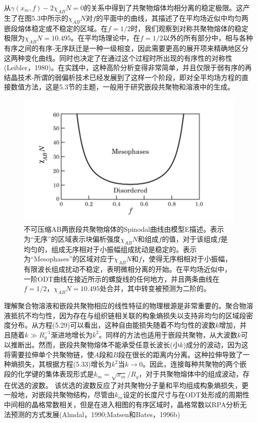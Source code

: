 从$\gamma(x_m,f)-2\chi_{AB}N=0$的关系中得到了共聚物熔体均相分离的稳定极限。这产生了在图5.3中所示的$\chi_{AB}N$对$f$的平面中的曲线，其描述了在平均场近似中均匀两嵌段熔体稳定或不稳定的区域。在$f=1/2$时，我们观察到对称共聚物熔体的稳定极限为$\chi_{AB}N=10.495$。在平均场理论中，在$f=1/2$以外的所有部分中，相与各种有序之间的有序-无序跃迁是一种一级相变，因此需要更高的展开项来精确地区分这两种变化曲线。同时也决定了在通过这个过程时所出现的有序性的对称性(Leibler，1980)。在实践中，这种高阶分析变得非常简单，并且仅限于弱有序的再结晶技术-所谓的弱偏析技术已经发展到了这样一个阶段，即对全平均场方程的直接数值方法，这是5.3节的主题，一般用于研究嵌段共聚物和溶液中的生成。
\begin{figure}[H]
      \centering
      \includegraphics[width=12cm]{./figures/4.png}
      \caption{不可压缩AB两嵌段共聚物熔体的Spinodal曲线由模型E描述。表示为“无序”的区域表示块偏析强度$\chi_{AB}N$和组成$f$的值，对于该组成$f$是均匀的，组成无序相对于小振幅组成扰动是稳定的。表示为“Mesophases”的区域对应于$\chi_{AB}N$和$f$，使得无序相相对于小振幅，有限波长组成扰动不稳定，表明微相分离的开始。在平均场近似中，一阶ODT曲线在接近所示的螺旋线的任何地方，并且两条曲线在$f=1/2$，$\chi_{AB}N=10.495$处合并，其中转变被预测为二阶的。}
\end{figure}
理解聚合物溶液和嵌段共聚物相应的线性特征的物理根源是非常重要的。聚合物溶液抵抗不均匀性，因为存在与组织链相关联的构象熵损失以支持非均匀的区域段密度分布。从方程(5.29)可以看出，这种自由能损失随着不均匀性的波数$k$增加，并且随着$k\gg R_g^{-1}$渐进地增长为$k^2$。同样的方法也适用于嵌段共聚物，从大波数$k$可以推断出。然而，嵌段共聚物熔体不能承受任意长波长(小$k$)成分的波动，因为这将需要拉伸单个共聚物链，使$A$段和$B$段在很长的距离内分离。这种拉伸导致了一种熵损失，其根据方程(5.33)增长为$k^2$当$k\rightarrow 0$。因此，连接每种共聚物的两个嵌段的化学键的集体表现形式是$k_m=\sqrt{x_m}/R_g$，对于共聚物熔体中的组成波动，存在优选的波数。
该优选的波数反应了对共聚物分子量和平均组成构象熵损失，更一般地，对嵌段共聚物结构，尽管由$k_m$设定的长度尺寸与在ODT处形成的周期性中间相的晶格常数相关，但是在进入相图的有序区域时，晶格常数以RPA分析无法预测的方式发展(Almdal，1990;Matsen和Bates，1996b)

